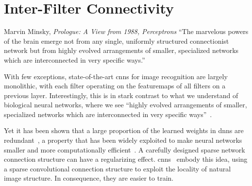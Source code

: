 \documentclass[thesis]{subfiles}
\begin{document}
	\chapter{Inter-Filter Connectivity}\label{deeproots}
	\begin{chapquote}{Marvin Minsky, \textit{Prologue: A View from 1988, Perceptrons}}
	``The marvelous powers of the brain emerge not from any single, uniformly structured connectionist network but from highly evolved arrangements of smaller, specialized networks which are interconnected in very specific ways.''
	\end{chapquote}
	
	With few exceptions, state-of-the-art \glspl{cnn} for image recognition are largely monolithic, with each filter operating on the \glspl{featuremap} of all filters on a previous layer. Interestingly, this is in stark contrast to what we understand of biological neural networks, where we see ``highly evolved arrangements of smaller, specialized networks which are interconnected in very specific ways''~\citep{minsky1988perceptrons}.
	
	Yet it has been shown that a large proportion of the learned weights in \glspl{dnn} are redundant~\citep{Denil2013predicting}, a property that has been widely exploited to make neural networks smaller and more computationally efficient~\citep{Szegedy2014going,Denton2014efficient}. 
	A carefully designed sparse network connection structure can have a regularizing effect. \Glspl{cnn}~\citep{Fuk80,Lecun1998} embody this idea, using a sparse convolutional connection structure to exploit the locality of natural image structure. In consequence, they are easier to train.
	
\end{document}
